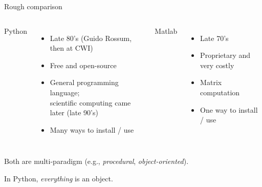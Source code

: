 \documentclass[usepdftitle=false, aspectratio=169]{beamer}
\begin{document}
\begin{frame}
  {Rough comparison}

  \begin{columns}

    \alert{Python}
    \begin{itemize}
      \item Late 80's (Guido Rossum, then at CWI)
      \item Free and open-source
      \item General programming language;\\
        scientific computing came later (late 90's)
      \item Many ways to install / use
    \end{itemize}

    \alert{Matlab}
    \begin{itemize}
      \item Late 70's
      \item Proprietary and very costly
      \item Matrix computation
      \item One way to install / use
    \end{itemize}

  \end{columns}

  \vspace{1em}

  Both are multi-paradigm (e.g., \emph{procedural}, \emph{object-oriented}).

  In Python, \emph{everything} is an object.

\end{frame}
\end{document}
